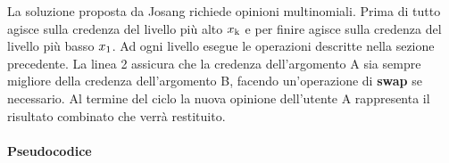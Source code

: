 \documentclass{report}
\newcommand{\myparagraph}[1]{\paragraph{#1}\mbox{} \mbox{}}
\begin{document}
	La soluzione proposta da Josang richiede opinioni multinomiali. Prima di
	tutto agisce sulla credenza del livello più alto $x\textsubscript{k}$ e per finire agisce
	sulla credenza del livello più basso $x\textsubscript{1}$. Ad ogni livello esegue le
	operazioni descritte nella sezione precedente. La linea 2 assicura che
	la credenza dell'argomento A sia sempre migliore della credenza
	dell'argomento B, facendo un'operazione di \textbf{swap} se necessario. Al
	termine del ciclo la nuova opinione dell'utente A rappresenta il
	risultato combinato che verrà restituito.
	
	\hypertarget{header-n156}{%
		\myparagraph{Pseudocodice}\label{header-n156}}
	
	\begin{center}
\end{center}
\end{document}
